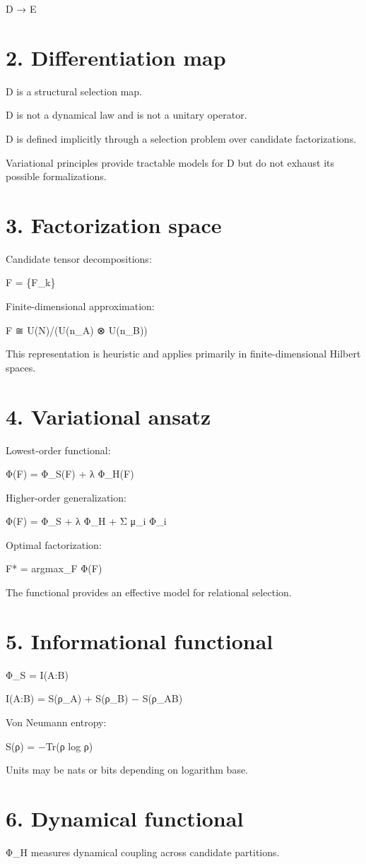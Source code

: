\documentclass[]{article}
\begin{document}
D → E

\section{2. Differentiation map}
D is a structural selection map.

D is not a dynamical law and is not a unitary operator.

D is defined implicitly through a selection problem over candidate factorizations.

Variational principles provide tractable models for D but do not exhaust its possible formalizations.

\section{3. Factorization space}
Candidate tensor decompositions:

F = \{F\_k\}

Finite-dimensional approximation:

F ≅ U(N)/(U(n\_A) ⊗ U(n\_B))

This representation is heuristic and applies primarily in finite-dimensional Hilbert spaces.

\section{4. Variational ansatz}
Lowest-order functional:

Φ(F) = Φ\_S(F) + λ Φ\_H(F)

Higher-order generalization:

Φ(F) = Φ\_S + λ Φ\_H + Σ μ\_i Φ\_i

Optimal factorization:

F* = argmax\_F Φ(F)

The functional provides an effective model for relational selection.

\section{5. Informational functional}
Φ\_S = I(A:B)

I(A:B) = S(ρ\_A) + S(ρ\_B) − S(ρ\_AB)

Von Neumann entropy:

S(ρ) = −Tr(ρ log ρ)

Units may be nats or bits depending on logarithm base.

\section{6. Dynamical functional}
Φ\_H measures dynamical coupling across candidate partitions.
\end{document}

